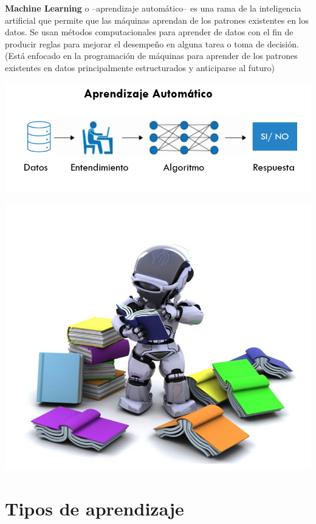 \documentclass[
]{book}
\begin{document}
\textbf{Machine Learning} o --aprendizaje automático-- es una rama de la inteligencia artificial que permite que las máquinas aprendan de los patrones existentes en los datos. Se usan métodos computacionales para aprender de datos con el fin de producir reglas para mejorar el desempeño en alguna tarea o toma de decisión. (Está enfocado en la programación de máquinas para aprender de los patrones existentes en datos principalmente estructurados y anticiparse al futuro)

\begin{center}\includegraphics[width=600pt]{img/01-repaso/02_ml} \end{center}

\begin{center}\includegraphics[width=600pt]{img/01-repaso/03_supervisado_robo} \end{center}

\hypertarget{tipos-de-aprendizaje}{%
\section{Tipos de aprendizaje}\label{tipos-de-aprendizaje}}
\end{document}
